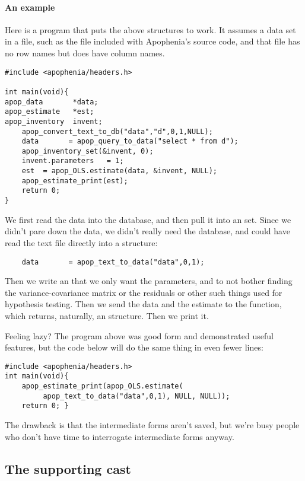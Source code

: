 \paragraph{An example}
Here is a program that puts the above structures to work.  It assumes a
data set in a file, such as the  file included with
Apophenia's source code, and that file has no row names but does have
column names.
\begin{lstlisting}
#include <apophenia/headers.h>

int main(void){
apop_data       *data;
apop_estimate   *est;
apop_inventory  invent;
    apop_convert_text_to_db("data","d",0,1,NULL);
    data       = apop_query_to_data("select * from d");
    apop_inventory_set(&invent, 0);
    invent.parameters   = 1;
    est  = apop_OLS.estimate(data, &invent, NULL);
    apop_estimate_print(est);
    return 0;
}
\end{lstlisting}

We first read the data into the database, and then pull it into an  set. Since we didn't pare down the data, we didn't really
need the database, and could have read the text file directly into a
 structure:
\begin{lstlisting}
    data       = apop_text_to_data("data",0,1);
\end{lstlisting}
Then we write an  that we only want the
parameters, and to not bother finding the variance-covariance matrix or
the residuals or other such things used for hypothesis testing. Then we
send the data and the estimate to the 
function, which returns, naturally, an 
structure. Then we print it.

Feeling lazy? The program above was good form and demonstrated useful
features, but the code below will do the same thing in even fewer lines:

\begin{lstlisting}
#include <apophenia/headers.h>
int main(void){
    apop_estimate_print(apop_OLS.estimate(
         apop_text_to_data("data",0,1), NULL, NULL));
    return 0; }
\end{lstlisting}

The drawback is that the intermediate forms aren't saved, but we're busy
people who don't have time to interrogate intermediate forms anyway.

\subsection{The supporting cast}
